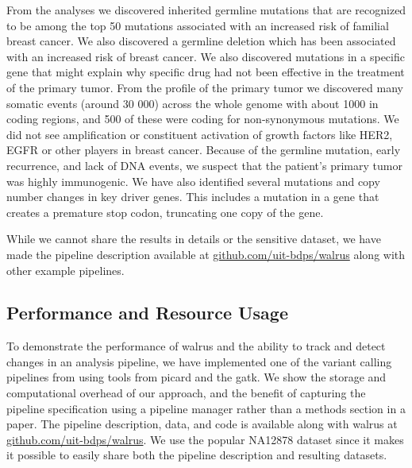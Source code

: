 From the analyses we discovered inherited germline mutations that are recognized
to be among the top 50 mutations associated with an increased risk of familial
breast cancer. We also discovered a germline deletion which has been associated
with an increased risk of breast cancer. We also discovered mutations in a
specific gene that might explain why specific drug had not been effective in the
treatment of the primary tumor. From the profile of the primary tumor we
discovered many somatic events (around 30 000) across the whole genome with
about 1000 in coding regions, and 500 of these were coding for non-synonymous
mutations.  We did not see amplification or constituent activation of growth
factors like HER2, EGFR or other players in breast cancer. Because of the
germline mutation, early recurrence, and lack of DNA events, we suspect that the
patient's primary tumor was highly immunogenic. We have also identified several
mutations and copy number changes in key driver genes. This includes a mutation
in a gene that creates a premature stop codon, truncating one copy of the gene.

While we cannot share the results in details or the sensitive dataset, we have
made the pipeline description available at \url{github.com/uit-bdps/walrus}
along with other example pipelines. 

\subsection{Performance and Resource Usage}
To demonstrate the performance of walrus and the ability to track and detect
changes in an analysis pipeline, we have implemented one of the variant calling
pipelines from \cite{cornish2015comparison} using tools from picard
and the \gls{gatk}. We show the storage and computational overhead of our
approach, and the benefit of capturing the pipeline specification using a
pipeline manager rather than a methods section in a paper. 
The pipeline description, data, and code is available along with walrus at
\url{github.com/uit-bdps/walrus}. We use the popular NA12878 dataset since it
makes it possible to easily share both the pipeline description and resulting
datasets. 



